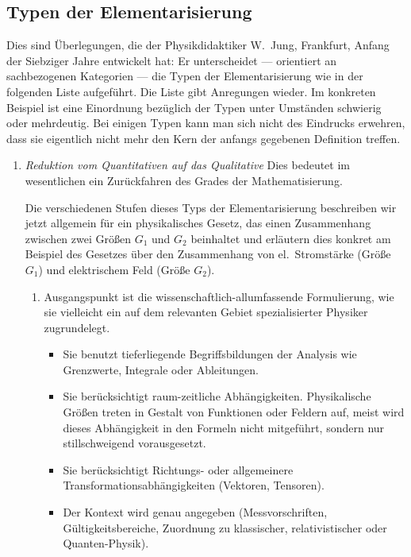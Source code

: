 \subsection{Typen der Elementarisierung}
Dies sind \"{U}berlegungen, die der Physikdidaktiker W.\ Jung,
Frankfurt, Anfang der Siebziger Jahre entwickelt hat:
Er unterscheidet --- orientiert an sachbezogenen Kategorien ---
die Typen der Elementarisierung wie
in der folgenden Liste aufgef\"{u}hrt.
Die Liste gibt Anregungen wieder. Im konkreten Beispiel ist eine
Einordnung bez\"{u}glich der Typen unter Umst\"{a}nden schwierig oder
mehrdeutig.
Bei einigen Typen kann man sich nicht des Eindrucks erwehren,
dass sie eigentlich nicht mehr den Kern der anfangs
gegebenen Definition treffen.

\begin{enumerate}
\item
{ \it Reduktion vom Quantitativen auf das Qualitative}
Dies bedeutet im wesentlichen ein Zur\"{u}ckfahren des
Grades der Mathematisierung.

\mip
Die verschiedenen Stufen dieses Typs der Elementarisierung
beschreiben wir jetzt allgemein f\"{u}r ein physikalisches Gesetz,
das einen Zusammenhang
zwischen zwei Gr\"{o}{\ss}en $G_1$ und $G_2$ beinhaltet und
erl\"{a}utern dies konkret am Beispiel des Gesetzes \"{u}ber
den Zusammenhang von el.\ Stromst\"{a}rke (Gr\"{o}{\ss}e $G_1$) und
elektrischem Feld (Gr\"{o}{\ss}e $G_2$).

\begin{enumerate}
\item
Ausgangspunkt ist die wissenschaftlich-allumfassende Formulierung,
wie sie vielleicht ein auf dem relevanten Gebiet spezialisierter
Physiker zugrundelegt.
\begin{itemize}
\item
Sie benutzt tieferliegende Begriffsbildungen der Analysis wie
Grenzwerte, Integrale oder Ableitungen.

\item
Sie ber\"{u}cksichtigt raum-zeitliche Abh\"{a}ngigkeiten.
Physikalische Gr\"{o}{\ss}en
treten in Gestalt von Funktionen oder Feldern auf, meist wird
dieses Abh\"{a}ngigkeit in den Formeln nicht mitgef\"{u}hrt,
sondern nur stillschweigend vorausgesetzt.
\item
Sie ber\"{u}cksichtigt Richtungs- oder allgemeinere
Trans\-for\-mations\-ab\-h\"{a}ngig\-kei\-ten (Vektoren, Tensoren).
\item
Der Kontext wird genau angegeben (Messvorschriften,
G\"{u}ltigkeitsbereiche, Zuordnung zu klassischer,
relativistischer oder Quanten-Physik).
\end{itemize}


\end{enumerate}
\end{enumerate}

